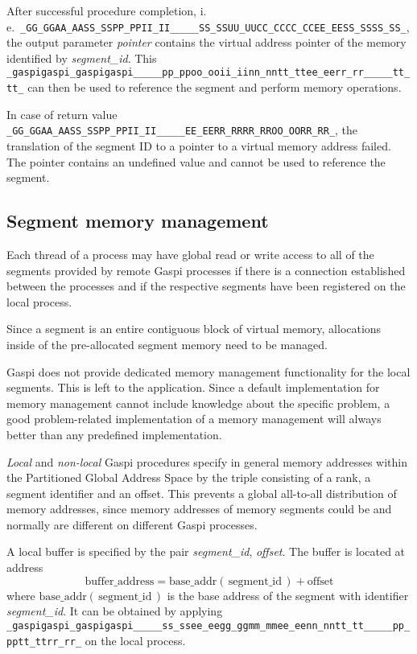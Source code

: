 \documentclass[a4paper]{article}
\makeatletter
\newlength{\lw}\setlength{\lw}{0.4pt}
\newlength{\st}\setlength{\st}{0pt}
\newcommand{\zerowsep}{\hskip 0pt plus 0.1pt minus 0.1pt}
\newcommand{\ZSEP}[1]{\ifx#1\@@@EOZ@@@\let\next\relax\else\ifx#1\_#1\zerowsep\else#1\fi\let\next\ZSEP\fi\next}
\newcommand{\zsep}[1]{\ZSEP{}#1\@@@EOZ@@@}
\newcommand{\gaspiprefix}{gaspi}
\newcommand{\GASPI}{{\sc Gaspi}}
\newcommand{\type}[1]{{\tt #1}}
\newcommand{\function}[1]{{\tt #1}}
\newcommand{\parameter}[1]{{\it #1}}
\newcommand{\gaspitype}[1]{\type{\protect\zsep{\gaspiprefix\_#1\_t}}}
\newcommand{\gaspifunction}[1]{\function{\protect\zsep{\gaspiprefix\_#1}}}
\newcommand{\GASPISUCC}{{\tt\protect\zsep{GASPI\_SUCCESS}}}
\newcommand{\GASPIGERR}{{\tt\protect\zsep{GASPI\_ERROR}}}
\newcommand{\gaspisemantic}[1]{{\emph{#1}}}
\makeatother
\begin{document}
After successful procedure completion, i.\,e.\ \GASPISUCC{}, the output parameter
\parameter{pointer} contains the virtual address pointer of the memory
identified by \parameter{segment\_id}. This \gaspitype{pointer} can
then be used to reference the segment and perform memory operations.

In case of return value \GASPIGERR{}, the translation of the segment ID
to a pointer to a virtual memory address failed. The pointer contains
an undefined value and cannot be used to reference the segment.

\subsection{Segment memory management}

Each thread of a process may have global read or write access to all of
the segments provided by remote \GASPI{} processes if there
is a connection established between the processes and if the
respective segments have been registered on the local process.

Since a segment is an entire contiguous block of virtual memory,
allocations inside of the pre-allocated segment memory need to be
managed.

\GASPI{} does not provide dedicated memory management functionality
for the local segments. This is left to the application.
Since a default implementation for memory management cannot include knowledge about the specific problem, a 
good problem-related implementation of a memory management will always better
than any predefined implementation.

\gaspisemantic{Local} and \gaspisemantic{non-local} \GASPI{} procedures
specify in general memory addresses within the Partitioned Global Address Space by
the triple consisting of a rank, a segment identifier and
an offset.  This prevents a global all-to-all distribution of memory
addresses, since memory addresses of memory segments could be and
normally are different on different \GASPI{} processes.

A local buffer is specified by the pair \parameter{segment\_id}, \parameter{offset}.
The buffer  is located at address
\begin{equation}
\mbox{buffer\_address} = \mbox{base\_addr}\left(\, \mbox{segment\_id} \,\right) + \mbox{offset} \nonumber
\end{equation}
where $\mbox{base\_addr}(\, \mbox{segment\_id} \,)$ is the base address of the segment with identifier
\parameter{segment\_id}.
It can be obtained by applying \gaspifunction{segment\_ptr} on the local process.
\end{document}
